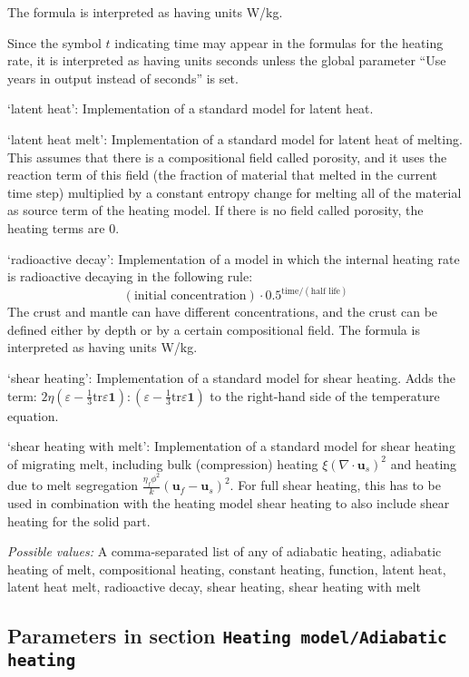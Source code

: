 \begin{itemize}
The formula is interpreted as having units W/kg.

Since the symbol $t$ indicating time may appear in the formulas for the heating rate, it is interpreted as having units seconds unless the global parameter ``Use years in output instead of seconds'' is set.

`latent heat': Implementation of a standard model for latent heat.

`latent heat melt': Implementation of a standard model for latent heat of melting. This assumes that there is a compositional field called porosity, and it uses the reaction term of this field (the fraction of material that melted in the current time step) multiplied by a constant entropy change for melting all of the material as source term of the heating model.
If there is no field called porosity, the heating terms are 0.

`radioactive decay': Implementation of a model in which the internal heating rate is radioactive decaying in the following rule:
\[(\text{initial concentration})\cdot 0.5^{\text{time}/(\text{half life})}\]
The crust and mantle can have different concentrations, and the crust can be defined either by depth or by a certain compositional field.
The formula is interpreted as having units W/kg.

`shear heating': Implementation of a standard model for shear heating. Adds the term: $  2 \eta \left( \varepsilon - \frac{1}{3} \text{tr} \varepsilon \mathbf 1 \right) : \left( \varepsilon - \frac{1}{3} \text{tr} \varepsilon \mathbf 1 \right)$ to the right-hand side of the temperature equation.

`shear heating with melt': Implementation of a standard model for shear heating of migrating melt, including bulk (compression) heating $\xi \left( \nabla \cdot \mathbf u_s \right)^2 $ and heating due to melt segregation $\frac{\eta_f \phi^2}{k} \left( \mathbf u_f - \mathbf u_s \right)^2 $. For full shear heating, this has to be used in combination with the heating model shear heating to also include shear heating for the solid part.


{\it Possible values:} A comma-separated list of any of adiabatic heating, adiabatic heating of melt, compositional heating, constant heating, function, latent heat, latent heat melt, radioactive decay, shear heating, shear heating with melt
\end{itemize}



\subsection{Parameters in section \tt Heating model/Adiabatic heating}
\label{parameters:Heating_20model/Adiabatic_20heating}

